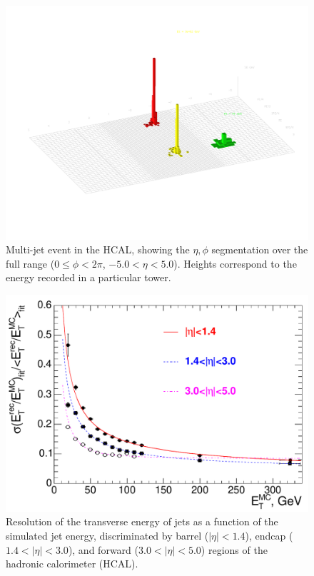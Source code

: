 \begin{figure}[htbp]
\begin{center}
\includegraphics[width=.7\linewidth]{Experiment/figures/HCALOutput.pdf}
\caption[Sample Output of the Hadronic Calorimeter]{Multi-jet event in the HCAL, showing the $\eta,\phi$ segmentation over the full range ($0\leq\phi<2\pi$, $-5.0<\eta<5.0$). Heights correspond to the energy recorded in a particular tower.}
\label{fig:HCALOutput}
\end{center}
\end{figure}

\begin{figure}[htbp]
\begin{center}
\includegraphics[width=.7\linewidth]{Experiment/figures/HCALResolution.pdf}
\caption[Resolution of the Hadronic Calorimeter as a Function of Simulated Transverse Energy]{Resolution of the transverse energy of jets as a function of the simulated jet energy, discriminated by barrel ($|\eta|<1.4$), endcap ($1.4<|\eta|<3.0$), and forward ($3.0<|\eta|<5.0$) regions of the hadronic calorimeter (HCAL).}
\label{fig:HCALResolution}
\end{center}
\end{figure}

